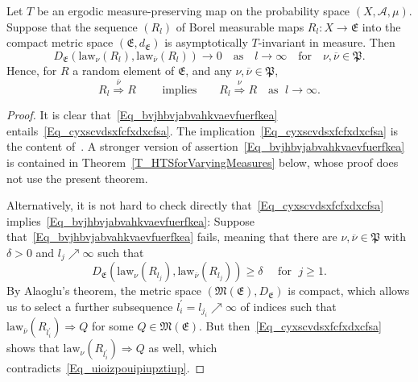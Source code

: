 \documentclass[AHL,Unicode,longabstracts]{cedram}
\newcommand{\clA}{\mathcal{A}}
\newcommand{\law}{\mathrm{law}}
\newcommand{\frkP}{\mathfrak{P}}
\newcommand{\frkE}{\mathfrak{E}}
\newcommand{\frkM}{\mathfrak{M}}
\begin{document}
\begin{theo}\label{T_MyOldStrongDistrCgeThm}
Let $T$ be an ergodic measure-preserving map on the probability space $(X,\clA,\mu)$. Suppose that the sequence $(R_{l})$ of Borel measurable maps $R_{l}:X\rightarrow \frkE$ into the compact metric space $(\frkE,d_{\frkE})$ is asymptotically $T$-invariant in measure. Then
\begin{equation}\label{Eq_bvjhbvjabvahkvaevfuerfkea}
D_{\frkE}\left(\law_{\nu}(R_{l}),\law_{\overline{\nu}} (R_{l})\right)\longrightarrow0\quad\text{as}\quad l\rightarrow\infty\quad\text{for}\quad
\nu,\overline{\nu}\in\frkP. 
\end{equation}
Hence, for $R$ a random element of $\frkE$, and any $\nu,\overline{\nu }\in\frkP$,
\begin{equation}\label{Eq_cyxscvdsxfcfxdxcfsa}
R_{l}\overset{\overline{\nu}}{\Longrightarrow}R\qquad \text{ implies} \qquad R_{l}\overset{\nu}{\Longrightarrow}R\quad\text{as }\; l\rightarrow
\infty.
\end{equation}
\end{theo}


\begin{proof}
It is clear that~\eqref{Eq_bvjhbvjabvahkvaevfuerfkea} entails~\eqref{Eq_cyxscvdsxfcfxdxcfsa}. The implication~\eqref{Eq_cyxscvdsxfcfxdxcfsa} is the content of~\cite[Theorem~1]{Z7}. A stronger version of assertion~\eqref{Eq_bvjhbvjabvahkvaevfuerfkea} is contained in Theorem~\ref{T_HTSforVaryingMeasures} below, whose proof does not use the present theorem.

Alternatively, it is not hard to check directly that~\eqref{Eq_cyxscvdsxfcfxdxcfsa} implies~\eqref{Eq_bvjhbvjabvahkvaevfuerfkea}: Suppose that~\eqref{Eq_bvjhbvjabvahkvaevfuerfkea} fails, meaning that there are $\nu,\overline{\nu}\in\frkP$ with $\delta>0$ and $l_{j}
\nearrow\infty$ such that
\begin{equation}\label{Eq_uioizpouipiupztiup}
D_{\frkE}\left(\law_{\nu}\left(R_{l_{j}}\right),\law_{\overline{\nu}}\left(R_{l_{j}}\right)\right)\geq\delta\quad \text{ for }\; j\geq1.
\end{equation}
By Alaoglu's theorem, the metric space $(\frkM(\frkE),D_{\frkE})$ is compact, which allows us to select a further subsequence $l_{i}^{\prime}=l_{j_{i}}\nearrow\infty$ of indices such that $\law_{\overline{\nu}}(R_{l_{i}^{\prime}})\Longrightarrow Q$ for some $Q\in\frkM(\frkE)$. But then~\eqref{Eq_cyxscvdsxfcfxdxcfsa} shows that $\law_{\nu}(R_{l_{i}^{\prime}})\Longrightarrow Q$ as well, which contradicts~\eqref{Eq_uioizpouipiupztiup}.
\end{proof}
\end{document}
